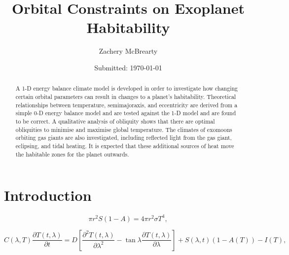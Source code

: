 \documentclass[12pt, onecolumn]{revtex4-2}    %
\newcommand{\partialderiv}[2]{\frac{\partial {#1}}{\partial {#2}}}
\newcommand{\partialderivsecnd}[2]{\frac{\partial^2 {#1}}{\partial {#2}^2}}
\begin{document}
\title{Orbital Constraints on Exoplanet Habitability}
\date{Submitted: \today{}}
\author{Zachery McBrearty}

\begin{abstract}
  A 1-D energy balance climate model is developed in order to investigate how changing certain orbital parameters can result in changes to a planet's habitability.
  Theoretical relationships between temperature, semimajoraxis, and eccentricity are derived from a simple 0-D energy balance model and are tested against the 1-D model and are found to be correct.
  A qualitative analysis of obliquity shows that there are optimal obliquities to minimise and maximise global temperature.
  The climates of exomoons orbiting gas giants are also investigated, including reflected light from the gas giant, eclipsing, and tidal heating.
  It is expected that these additional sources of heat move the habitable zones for the planet outwards.

\end{abstract}


\maketitle

\tableofcontents

\newpage

\section{Introduction} \label{sec:Introduction}


\begin{equation}
  \pi r^2 S(1-A) = 4 \pi r^2 \sigma T^4,
  \label{eq:0DEBCM}
\end{equation}

\begin{equation}
  C(\lambda, T) \partialderiv{T(t, \lambda)}{t} = D\left[\partialderivsecnd{T(t, \lambda)}{\lambda} - \tan\lambda\partialderiv{T(t, \lambda)}{\lambda}\right] + S(\lambda, t)(1-A(T)) - I(T),
  \label{eq:1DEBCM}
\end{equation}
\end{document}
